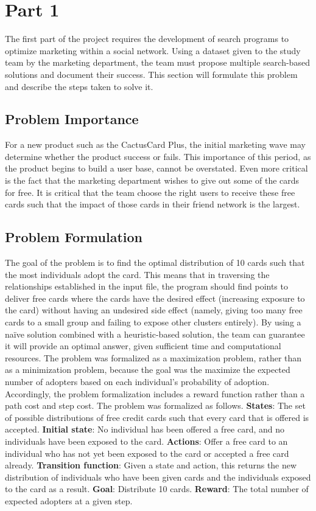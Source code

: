 \documentclass[11pt,journal]{IEEEtran}
\begin{document}
\IEEEpeerreviewmaketitle

\section{Part 1} \label{part1}
The first part of the project requires the development of search programs to optimize marketing within a social network. Using a dataset given to the study team by the marketing department, the team must propose multiple search-based solutions and document their success. This section will formulate this problem and describe the steps taken to solve it.

\subsection{Problem Importance}
For a new product such as the CactusCard Plus, the initial marketing wave may determine whether the product success or fails. This importance of this period, as the product begins to build a user base, cannot be overstated. Even more critical is the fact that the marketing department wishes to give out some of the cards for free. It is critical that the team choose the right users to receive these free cards such that the impact of those cards in their friend network is the largest.

\subsection{Problem Formulation}
The goal of the problem is to find the optimal distribution of 10 cards such that the most individuals adopt the card. This means that in traversing the relationships established in the input file, the program should find points to deliver free cards where the cards have the desired effect (increasing exposure to the card) without having an undesired side effect (namely, giving too many free cards to a small group and failing to expose other clusters entirely). By using a na{\"i}ve solution combined with a heuristic-based solution, the team can guarantee it will provide an optimal answer, given sufficient time and computational resources. The problem was formalized as a maximization problem, rather than as a minimization problem, because the goal was the maximize the expected number of adopters based on each individual's probability of adoption. Accordingly, the problem formalization includes a reward function rather than a path cost and step cost. The problem was formalized as follows. \textbf{States}: The set of possible distributions of free credit cards such that every card that is offered is accepted. \textbf{Initial state}: No individual has been offered a free card, and no individuals have been exposed to the card. \textbf{Actions}: Offer a free card to an individual who has not yet been exposed to the card or accepted a free card already. \textbf{Transition function}: Given a state and action, this returns the new distribution of individuals who have been given cards and the individuals exposed to the card as a result. \textbf{Goal}: Distribute 10 cards. \textbf{Reward}: The total number of expected adopters at a given step.
\end{document}
